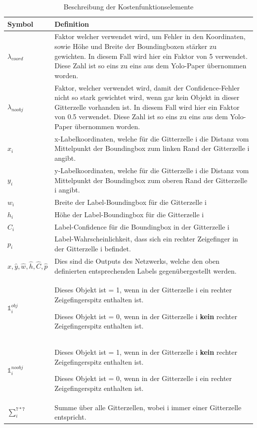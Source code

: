 \begin{table}
\centering
\begin{tabularx}{\textwidth}{|l|X|}
\hline  \textbf{Symbol} & \textbf{Definition}\\
\hline  $\lambda_{coord}$  & Faktor welcher verwendet wird, um Fehler in den Koordinaten, sowie Höhe und Breite der Boundingboxen stärker zu gewichten. In diesem Fall wird hier ein Faktor von 5 verwendet. Diese Zahl ist so eins zu eins aus dem Yolo-Paper \cite{yolo} übernommen worden.\\
\hline  $\lambda_{noobj}$  & Faktor, welcher verwendet wird, damit der Confidence-Fehler nicht so stark gewichtet wird, wenn gar kein Objekt in dieser Gitterzelle vorhanden ist. In diesem Fall wird hier ein Faktor von 0.5 verwendet. Diese Zahl ist so eins zu eins aus dem Yolo-Paper \cite{yolo} übernommen worden.\\
\hline  $x_i$  & x-Labelkoordinaten, welche für die Gitterzelle i die Distanz vom Mittelpunkt der Boundingbox zum linken Rand der Gitterzelle i angibt.\\
\hline  $y_i$  & y-Labelkoordinaten, welche für die Gitterzelle i die Distanz vom Mittelpunkt der Boundingbox zum oberen Rand der Gitterzelle i angibt.\\
\hline  $w_i$  & Breite der Label-Boundingbox für die Gitterzelle i\\
\hline  $h_i$  & Höhe der Label-Boundingbox für die Gitterzelle i\\
\hline  $C_i$  & Label-Confidence für die Boundingbox in der Gitterzelle i\\
\hline  $p_i$  & Label-Wahrscheinlichkeit, dass sich ein rechter Zeigefinger in der Gitterzelle i befindet. \\	
\hline  $\hat{x},\hat{y},\hat{w},\hat{h},\hat{C},\hat{p}$  & Dies sind die Outputs des Netzwerks, welche den oben definierten entsprechenden Labels gegenübergestellt werden.\\
\hline  $\mathds{1}_{i}^{obj}$  & Dieses Objekt ist = 1, wenn in der Gitterzelle i ein rechter Zeigefingerspitz enthalten ist. 

Dieses Objekt ist = 0, wenn in der Gitterzelle i \textbf{kein} rechter Zeigefingerspitz enthalten ist.\\	
\hline  $\mathds{1}_{i}^{noobj}$  & Dieses Objekt ist = 1, wenn in der Gitterzelle i \textbf{kein} rechter Zeigefingerspitz enthalten ist. 

Dieses Objekt ist = 0, wenn in der Gitterzelle i ein rechter Zeigefingerspitz enthalten ist.\\
\hline $\sum_{i}^{7*7}$ & Summe über alle Gitterzellen, wobei i immer einer Gitterzelle entspricht.\\
\hline
\end{tabularx}
\caption{Beschreibung der Kostenfunktionselemente}
\label{tbl:beschr_kostenfuntion}
\end{table} 

